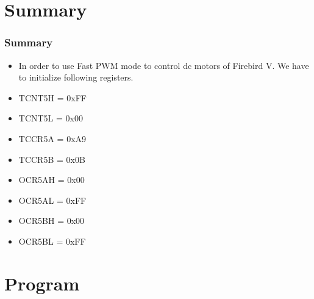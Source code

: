 \documentclass[table,10pt,red]{beamer}	%
\begin{document}
\section{Summary}
\begin{frame}
\frametitle{Summary}
 \begin{itemize}
 	\item <+-|alert@+> In order to use Fast PWM mode to control dc motors of Firebird V. We have to initialize following registers.
 	\item
 	\pause
 	TCNT5H  = 0xFF 
 	\item
 	\pause
 	TCNT5L = 0x00 
	\item
	\pause
	TCCR5A  = 0xA9
	\item
	\pause 
	TCCR5B = 0x0B 
	\item
	\pause 
	OCR5AH = 0x00 
	\item
	\pause 
	OCR5AL = 0xFF
	\item
	\pause 
	OCR5BH = 0x00 
	\item
	\pause
	OCR5BL = 0xFF
	
\end{itemize}
\end{frame}
\section{Program}

\end{document}

